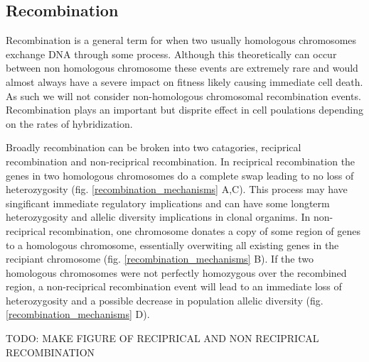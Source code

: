 \documentclass{article}
\begin{document}
    \subsection{Recombination}
    Recombination is a general term for when two usually homologous chromosomes exchange DNA through some process.   Although this theoretically can occur between non homologous chromosome these events are extremely rare and would almost always have a severe impact on fitness likely causing immediate cell death.  As such we will not consider non-homologous chromosomal recombination events.  Recombination plays an important but disprite effect in cell poulations depending on the rates of hybridization. 

    Broadly recombination can be broken into two catagories, reciprical recombination and non-reciprical recombination.  In reciprical recombination the genes in two homologous chromosomes do a complete swap leading to no loss of heterozygosity (fig. \ref{recombination_mechanisms} A,C).  This process may have singificant immediate regulatory implications and can have some longterm heterozygosity and allelic diversity implications in clonal organims.  In non-reciprical recombination, one chromosome donates a copy of some region of genes to a homologous chromosome, essentially overwiting all existing genes in the recipiant chromosome (fig. \ref{recombination_mechanisms} B).  If the two homologous chromosomes were not perfectly homozygous over the recombined region, a non-reciprical recombination event will lead to an immediate loss of heterozygosity and a possible decrease in population allelic diversity (fig. \ref{recombination_mechanisms} D).  \bigskip

        TODO: MAKE FIGURE OF RECIPRICAL AND NON RECIPRICAL RECOMBINATION \bigskip
    
\end{document}
